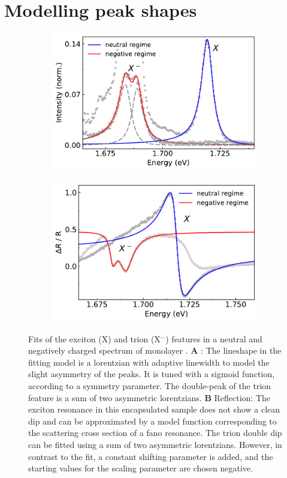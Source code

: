 \section{Modelling peak shapes}\label{fits}

\begin{figure}[t]
	\begin{subfigure}{0.49\textwidth}
		\caption{}
		\includegraphics[height=0.65\textwidth]{X_Trion_fit}
	\end{subfigure}
	\begin{subfigure}{0.49\textwidth}
		\caption{}
		\includegraphics[height=0.65\textwidth]{RF_neut_neg}
	\end{subfigure}
	\caption{Fits of the exciton (X) and trion (X$^-$) features in a neutral and negatively charged spectrum of monolayer \wse\!. \textbf{A} \pl : The lineshape in the fitting model is a lorentzian with adaptive linewidth to model the slight asymmetry of the peaks. It is tuned with a sigmoid function, according to a symmetry parameter. The double-peak of the trion feature is a sum of two asymmetric lorentzians. \textbf{B} Reflection: The exciton resonance in this \hbng encapsulated sample does not show a clean dip and can be approximated by a model function corresponding to the scattering cross section of a fano resonance. The trion double dip can be fitted using a sum of two asymmetric lorentzians. However, in contrast to the \pl fit, a constant shifting parameter is added, and the starting values for the scaling parameter are chosen negative.}\label{linefits}
\end{figure}


